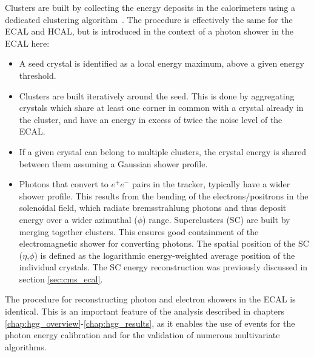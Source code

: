 Clusters are built by collecting the energy deposits in the calorimeters using a dedicated clustering algorithm~\cite{Khachatryan:2015hwa}. The procedure is effectively the same for the ECAL and HCAL, but is introduced in the context of a photon shower in the ECAL here:
\begin{itemize}
    \item A seed crystal is identified as a local energy maximum, above a given energy threshold.
    \item Clusters are built iteratively around the seed. This is done by aggregating crystals which share at least one corner in common with a crystal already in the cluster, and have an energy in excess of twice the noise level of the ECAL.
    \item If a given crystal can belong to multiple clusters, the crystal energy is shared between them assuming a Gaussian shower profile.
    \item Photons that convert to $e^+e^-$ pairs in the tracker, typically have a wider shower profile. This results from the bending of the electrons/positrons in the solenoidal field, which radiate bremsstrahlung photons and thus deposit energy over a wider azimuthal ($\phi$) range. Superclusters (SC) are built by merging together clusters. This ensures good containment of the electromagnetic shower for converting photons. The spatial position of the SC ($\eta$,$\phi$) is defined as the logarithmic energy-weighted average position of the individual crystals. The SC energy reconstruction was previously discussed in section \ref{sec:cms_ecal}.
\end{itemize}
\noindent
The procedure for reconstructing photon and electron showers in the ECAL is identical. This is an important feature of the \Hgg analysis described in chapters \ref{chap:hgg_overview}-\ref{chap:hgg_results}, as it enables the use of \Zee events for the photon energy calibration and for the validation of numerous multivariate algorithms.

